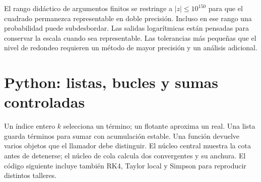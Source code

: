 \documentclass[11pt,a4paper]{article}
\theoremstyle{definition}
\begin{document}
El rango didáctico de argumentos finitos se restringe a $|z|\le10^{150}$ para que el cuadrado permanezca representable en doble precisión. Incluso en ese rango una probabilidad puede subdesbordar. Las salidas logarítmicas están pensadas para conservar la escala cuando sea representable. Las tolerancias más pequeñas que el nivel de redondeo requieren un método de mayor precisión y un análisis adicional.

\section{Python: listas, bucles y sumas controladas}
Un índice entero $k$ selecciona un término; un flotante aproxima un real. Una lista guarda términos para sumar con acumulación estable. Una función devuelve varios objetos que el llamador debe distinguir. El núcleo central muestra la cota antes de detenerse; el núcleo de cola calcula dos convergentes y su anchura. El código siguiente incluye también RK4, Taylor local y Simpson para reproducir distintos talleres.
\end{document}
